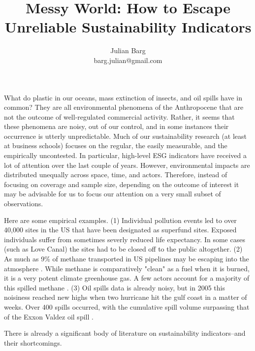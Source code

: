 \documentclass[12pt, man, natbib]{apa6}
\title{Messy World: How to Escape Unreliable Sustainability Indicators}
\author{Julian Barg\\barg.julian@gmail.com}
\affiliation{Ivey Business School}
\begin{document}
	
	\maketitle
	
	\singlespacing
	
	\section{}
	
	What do plastic in our oceans, mass extinction of insects, and oil spills have in common? They are all environmental phenomena of the Anthropocene that are not the outcome of well-regulated commercial activity. Rather, it seems that these phenomena are noisy, out of our control, and in some instances their occurrence is utterly unpredictable. Much of our sustainability research (at least at business schools) focuses on the regular, the easily measurable, and the empirically uncontested. In particular, high-level ESG indicators have received a lot of attention over the last couple of years. However, environmental impacts are distributed unequally across space, time, and actors. Therefore, instead of focusing on coverage and sample size, depending on the outcome of interest it may be advisable for us to focus our attention on a very small subset of observations.
	
	Here are some empirical examples. (1) Individual pollution events led to over 40,000 sites in the US that have been designated as superfund sites. Exposed individuals suffer from sometimes severly reduced life expectancy. In some cases (such as Love Canal) the sites had to be closed off to the public altogether. (2) As much as 9\% of methane transported in US pipelines may be escaping into the atmosphere \citep{Tollefson20t13}. While methane is comparatively "clean" as a fuel when it is burned, it is a very potent climate greenhouse gas. A few actors account for a majority of this spilled methane \citep{Tollefson2013}. (3) Oil spills data is already noisy, but in 2005 this noisiness reached new highs when two hurricane hit the gulf coast in a matter of weeks. Over 400 spills occurred, with the cumulative spill volume surpassing that of the Exxon Valdez oil spill \citep{Cruz2009}.
	
	There is already a significant body of literature on sustainability indicators--and their shortcomings. 


\end{document}
